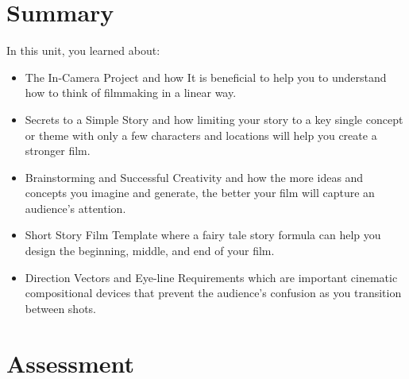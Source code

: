 \documentclass[
]{book}
\begin{document}
\hypertarget{summary-5}{%
\section*{Summary}\label{summary-5}}

In this unit, you learned about:

\begin{itemize}
\item
  The In-Camera Project and how It is beneficial to help you to understand how to think of filmmaking in a linear way.
\item
  Secrets to a Simple Story and how limiting your story to a key single concept or theme with only a few characters and locations will help you create a stronger film.
\item
  Brainstorming and Successful Creativity and how the more ideas and concepts you imagine and generate, the better your film will capture an audience's attention.
\item
  Short Story Film Template where a fairy tale story formula can help you design the beginning, middle, and end of your film.
\item
  Direction Vectors and Eye-line Requirements which are important cinematic compositional devices that prevent the audience's confusion as you transition between shots.
\end{itemize}

\hypertarget{assessment-11}{%
\section*{Assessment}\label{assessment-11}}
\end{document}
